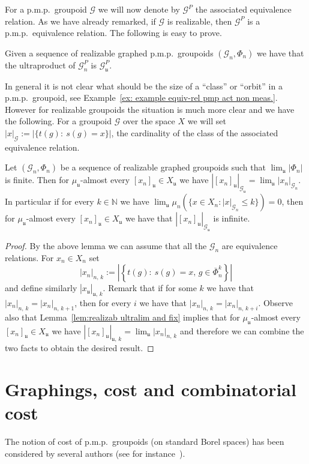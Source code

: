 \documentclass[AHL,Unicode,longabstracts,published]{cedram}
\newcommand{\Nmath}{\mathbb{N}}
\newcommand{\cg}{\mathcal{G}}
\newcommand{\ul}{\mathfrak{u}}
\newcommand{\pmp}{p.m.p.\ }
\begin{document}
For a \pmp groupoid $\cg$ we will now denote by $\cg^P$ the associated equivalence relation. As we have already remarked, if $\cg$ is realizable, then $\cg^P$ is a \pmp equivalence relation. The following is easy to prove.

\begin{lemm}
Given a sequence of realizable graphed \pmp groupoids $(\cg_n, \Phi_n)$ we have that the ultraproduct of $\cg_n^P$ is $\cg_\ul^P$.
\end{lemm}

In general it is not clear what should be the size of a ``class'' or ``orbit'' in a \pmp groupoid, see Example~\ref{ex: example equiv-rel pmp act non meas.}. However for realizable groupoids the situation is much more clear and we have the following. For a groupoid $\cg$ over the space $X$ we will set $|x|_\cg:=|\{t(g):\ s(g)=x\}|$, the cardinality of the class of the associated equivalence relation.

\begin{lemm}\label{lem: ultralim has infinite orbits}
Let $(\cg_n, \Phi_n)$ be a sequence of realizable graphed groupoids such that $\lim_\ul|\Phi_n|$ is finite. Then for $\mu_{\ul}$-almost every $[x_n]_\ul\in X_\ul$ we have $|[x_n]_\ul|_{\cg_\ul}=\lim_\ul |x_n|_{\cg_n}$. In particular if for every $k\in \Nmath$ we have $\lim_\ul\mu_{n}(\{x\in X_n: \vert x \vert_{\cg_n} \leq k\})= 0$, then for $\mu_{\ul}$-almost every $[x_n]_\ul\in X_\ul$ we have that $|[x_n]_\ul|_{\cg_\ul}$ is infinite.
\end{lemm}
\begin{proof}
By the above lemma we can assume that all the $\cg_n$ are equivalence relations. For $x_n\in X_n$ set
\[
|x_n|_{n,\,k}:=\left| \left\{t(g):\ s(g)=x,\, g\in \overline \Phi_n^k\right\}\right|
\]
and define similarly $|x_\ul|_{\ul,\,k}$. Remark that if for some $k$ we have that $|x_n|_{n,\,k}=|x_n|_{n,\,k+1}$, then for every $i$ we have that $|x_n|_{n,\,k}=|x_n|_{n,\,k+i}$. Observe also that Lemma~\ref{lem:realizab ultralim and fix} implies that for $\mu_{\ul}$-almost every $[x_n]_\ul\in X_\ul$ we have $|[x_n]_\ul|_{\ul,\,k}=\lim_\ul |x_n|_{n,\,k}$ and therefore we can combine the two facts to obtain the desired result.
\end{proof}
\pagebreak
\section{Graphings, cost and combinatorial cost}\label{sect: cost and comb cost}

The notion of cost of \pmp groupoids (on standard Borel spaces) has been considered by several authors (see for instance~\cite{Abert-Nikolov-12,Carderi-Master-thesis-2011,Takimoto-cost-L2-2005,Ueda-cost-2006}).
\end{document}
